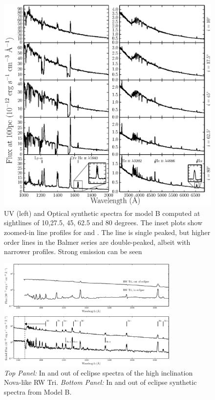 \documentclass[preprint, a4paper, 11pt]{aastex}
\begin{document}
\begin{figure} %
\includegraphics[width=\textwidth]{figures/fig14_uv_opt.eps}
\caption{
UV (left) and Optical synthetic spectra for model B computed at
sightlines of 10,27.5, 45, 62.5 and 80 degrees.	
The inset plots show zoomed-in line profiles for 
\heiiuv and \ha. The \ha line 
is single peaked, but higher order lines in the Balmer series
are double-peaked, albeit with narrower profiles.
Strong \heiiopt emission can be seen
}
\label{uvoptb}
\end{figure} %


\begin{figure} %
\includegraphics[width=0.8\textwidth]{figures/fig13_eclipse.eps}
\caption{{\sl Top Panel:} In and out of eclipse spectra of the high
inclination Nova-like RW Tri. {\sl Bottom Panel:} In and out of eclipse synthetic
spectra from Model B.}
\label{rwtricomp}
\end{figure} %
\end{document}
